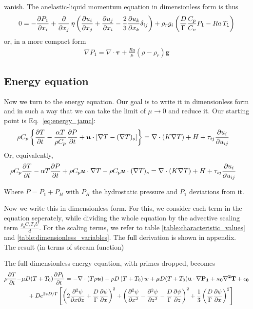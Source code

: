 \documentclass[a4paper]{article}
\begin{document}
vanish. The anelastic-liquid momentum equation in dimensionless form is thus 
\begin{align} \label{eq:ALA_momentum}
    0 = -\pdv{P_1}{x_i}+\pdv{x_j}\,\eta\left(\pdv{u_i}{x_j}+\pdv{u_j}{x_i}-\frac{2}{3}\pdv{u_k}{x_k}\delta_{ij}\right)+\rho_r g_i\left(\frac{D}{\Gamma}\frac{C_p}{C_v}P_1-Ra\,T_1\right)
\end{align}
or, in a more compact form 
\begin{align*}
    \nabla P_1 = \nabla \cdot \bm{\tau} + \frac{\mathit{Ra}}{\mu}(\rho-\rho_r)\bm{g}
\end{align*}
 
\subsection{Energy equation}
Now we turn to the energy equation. Our goal is to write it in dimensionless form and in such a way that we can take the limit of $\mu \to 0$ and reduce it. 
Our starting point is Eq.~\eqref{eq:energy_jamc}: 
\begin{align*}
    \rho C_p \left\{\pdv{T}{t} - \frac{\alpha T}{\rho C_p}\pdv{P}{t} + \bm{u} \cdot [\nabla T - (\nabla T)_s]\right\} &= 
    \nabla \cdot (K\nabla T) + H + \tau_{ij}\pdv{u_i}{u_{ij}}
\end{align*}
Or, equivalently,
\begin{align*}
    \rho C_p\pdv{T}{t} - \alpha T\pdv{P}{t} + \rho C_p \bm{u} \cdot \nabla T - \rho C_p \bm{u} \cdot (\nabla T)_s &= 
    \nabla \cdot (K\nabla T) + H + \tau_{ij}\pdv{u_i}{u_{ij}}
\end{align*}

Where $P = P_1 + P_H$ with $P_H$ the hydrostatic pressure and $P_1$ deviations from it. 

Now we write this in dimensionless form. For this, we consider each term in the equation seperately, while dividing the whole equation by the advective scaling term 
$\frac{\rho_0 C_p T_1 U}{d}$. For the scaling terms, we refer to table \ref{table:characteristic_values} and \ref{table:dimensionless_variables}. 
The full derivation is shown in appendix. 
The result (in terms of stream function)

The full dimensionless energy equation, with primes dropped, becomes 
\begin{align}
    \rho \pdv{T}{t} - &\mu D (T+T_0) \pdv{P_1}{t}
  = -\nabla\cdot\left( T \rho \bm{u} \right)
     - \rho D \left( T + T_0 \right) w
     + \mu D (T+T_0) \bf{u}\cdot\nabla P_1
     + \kappa_0 \nabla^{2} T + \epsilon_0 \notag \\
  &\quad + D e^{2zD/\Gamma}
  \left[
    \left( 2\pdv{\psi}{x}{z} + \frac{D}{\Gamma}\pdv{\psi}{x} \right)^{2}
  + \left( \pdv[2]{\psi}{x} - \pdv[2]{\psi}{z} - \frac{D}{\Gamma}\pdv{\psi}{z} \right)^{2}
  + \frac{1}{3}\left( \frac{D}{\Gamma}\pdv{\psi}{x} \right)^{2}
  \right] \label{eq:30}
\end{align}
\end{document}

